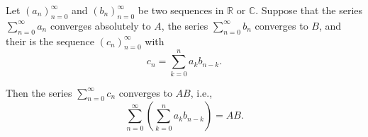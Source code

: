 \begin{theorem} \label{theorem:mertens_theorem_on_cauchy_product_of_series}
    Let $(a_n)_{n=0}^\infty$ and $(b_n)_{n=0}^\infty$ be two sequences in $\mathbb{R}$ or $\mathbb{C}$. Suppose that the series $\sum_{n=0}^\infty a_n$ converges absolutely to $A$, the series $\sum_{n=0}^\infty b_n$ converges to $B$, and their  is the sequence $(c_n)_{n=0}^\infty$ with
    $$c_n = \sum_{k=0}^n a_k b_{n-k}.$$

    Then the series $\sum_{n=0}^\infty c_n$ converges to $AB$, i.e.,
    $$\sum_{n=0}^\infty \left( \sum_{k=0}^n a_k b_{n-k} \right) = AB.$$
\end{theorem}

